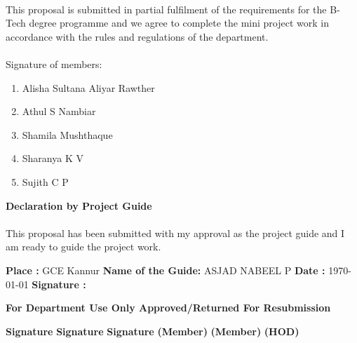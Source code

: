 \documentclass[12pt,a4paper]{article}
\begin{document}
\begin{flushleft}
		\paragraph{} This proposal is submitted in partial fulfilment of the requirements for the B-Tech degree programme and we agree to complete the mini project work in accordance with the rules and regulations of the department.
		
		\paragraph{} Signature of members:
		
		\begin{enumerate}
			\item Alisha Sultana Aliyar Rawther
			\item Athul S Nambiar
			\item Shamila Mushthaque
			\item Sharanya K V
			\item Sujith C P \newline
		\end{enumerate}


		\begin{center}
			{\Large \textbf{Declaration by Project Guide} }
		\end{center}
		\paragraph{} This proposal has been submitted with my approval as the project guide and I am ready to guide the project work.\newline
		
		\textbf{Place : } GCE Kannur \hfill		\textbf{Name of the Guide:} ASJAD NABEEL P
		\newline
		\newline
		\textbf{Date  : }\today \hspace{7.5em} \textbf{Signature : }
		\newline
		\newline
		\newline
		
		\begin{center}
			{\Large \textbf{For Department Use Only\hspace{7em} Approved/Returned For Resubmission} }
			\newline
			\newline
			\newline
		\end{center}

		
		\textbf{Signature} \hspace{10em}
		\textbf{Signature} \hspace{10em}
		\textbf{Signature}
		\newline
		\textbf{(Member)} \hspace{9.6em}
		\textbf{(Member)} \hspace{10.5em}
		\textbf{(HOD)}

		
		

\end{flushleft}
\end{document}
